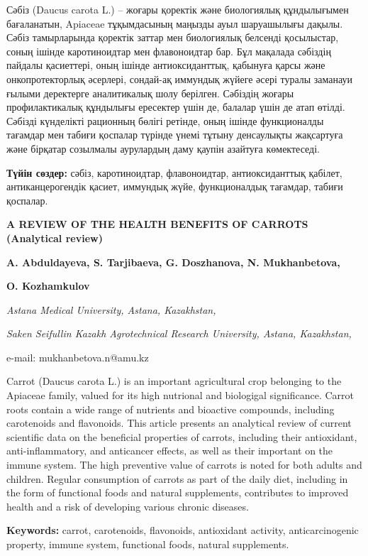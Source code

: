 Сәбіз (Daucus carota L.) -- жоғары қоректік және биологиялық
құндылығымен бағаланатын, Apiaceae тұқымдасының маңызды ауыл шаруашылығы
дақылы. Сәбіз тамырларында қоректік заттар мен биологиялық белсенді
қосылыстар, соның ішінде каротиноидтар мен флавоноидтар бар. Бұл
мақалада сәбіздің пайдалы қасиеттері, оның ішінде антиоксиданттық,
қабынуға қарсы және онкопротекторлық әсерлері, сондай-ақ иммундық жүйеге
әсері туралы заманауи ғылыми деректерге аналитикалық шолу берілген.
Сәбіздің жоғары профилактикалық құндылығы ересектер үшін де, балалар
үшін де атап өтілді. Сәбізді күнделікті рационның бөлігі ретінде, оның
ішінде функционалды тағамдар мен табиғи қоспалар түрінде үнемі тұтыну
денсаулықты жақсартуға және бірқатар созылмалы аурулардың даму қаупін
азайтуға көмектеседі.

{\bfseries Түйін сөздер:} сәбіз, каротиноидтар, флавоноидтар,
антиоксиданттық қабілет, антиканцерогендік қасиет, иммундық жүйе,
функционалдық тағамдар, табиғи қоспалар.

{\bfseries A REVIEW OF THE HEALTH BENEFITS OF CARROTS (Analytical review)}

{\bfseries {}A. Abduldayeva, S.
Tarjibaeva, G. Doszhanova, N.
Mukhanbetova\envelope ,}

{\bfseries {}O. Kozhamkulov}

\emph{Astana Medical University, Astana, Kazakhstan,}

\emph{Saken Seifullin Kazakh Agrotechnical Research
University, Astana, Kazakhstan,}

e-mail:
mukhanbetova.n@amu.kz

Carrot (Daucus carota L.) is an important agricultural crop belonging to
the Apiaceae family, valued for its high nutrional and biologigal
significance. Carrot roots contain a wide range of nutrients and
bioactive compounds, including carotenoids and flavonoids. This article
presents an analytical review of current scientific data on the
beneficial properties of carrots, including their antioxidant,
anti-inflammatory, and anticancer effects, as well as their important on
the immune system. The high preventive value of carrots is noted for
both adults and children. Regular consumption of carrots as part of the
daily diet, including in the form of functional foods and natural
supplements, contributes to improved health and a risk of developing
various chronic diseases.

{\bfseries Keywords:} carrot, carotenoids, flavonoids, antioxidant
activity, anticarcinogenic property, immune system, functional foods,
natural supplements.


